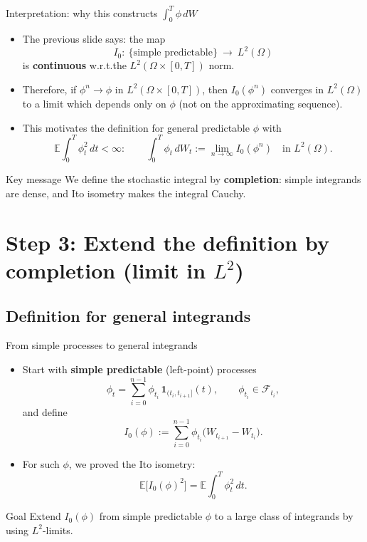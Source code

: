\documentclass[10pt,aspectratio=169]{beamer}
\newcommand{\E}{\mathbb{E}}
\begin{document}
\begin{frame}{Interpretation: why this constructs $\int_0^T \phi\,dW$}

\begin{itemize}
  \item The previous slide says: the map
  \[
  I_0:\ \{\text{simple predictable}\}\ \to\ L^2(\Omega)
  \]
  is \textbf{continuous} w.r.t.the $L^2(\Omega\times[0,T])$ norm.\pause

  \item Therefore, if $\phi^n\to \phi$ in $L^2(\Omega\times[0,T])$, then $I_0(\phi^n)$ converges in $L^2(\Omega)$
  to a limit which depends only on $\phi$ (not on the approximating sequence).\pause

  \item This motivates the definition for general predictable $\phi$ with
  \[
  \E\int_0^T \phi_t^2\,dt < \infty:
  \qquad
  \int_0^T \phi_t\,dW_t
  := \lim_{n\to\infty} I_0(\phi^n)
  \quad \text{in }L^2(\Omega).
  \]
\end{itemize}

\begin{alertblock}{Key message}
We define the stochastic integral by \textbf{completion}:
simple integrands are dense, and Ito isometry makes the integral Cauchy.
\end{alertblock}

\end{frame}

\section{Step 3: Extend the definition by completion (limit in $L^2$)}

\subsection{Definition for general integrands}

\begin{frame}{From simple processes to general integrands}

\begin{itemize}
  \item Start with \textbf{simple predictable} (left-point) processes
  \[
  \phi_t=\sum_{i=0}^{n-1}\phi_{t_i}\,\mathbf{1}_{(t_i,t_{i+1}]}(t),
  \qquad \phi_{t_i}\in\mathcal{F}_{t_i},
  \]
  and define
  \[
  I_0(\phi):=\sum_{i=0}^{n-1}\phi_{t_i}\big(W_{t_{i+1}}-W_{t_i}\big).
  \]
  \pause

  \item For such $\phi$, we proved the Ito isometry:
  \[
  \E\big[I_0(\phi)^2\big]=\E\int_0^T \phi_t^2\,dt.
  \]
\end{itemize}

\medskip
\begin{alertblock}{Goal}
Extend $I_0(\phi)$ from simple predictable $\phi$ to a large class of integrands
by using $L^2$-limits.
\end{alertblock}

\end{frame}
\end{document}
